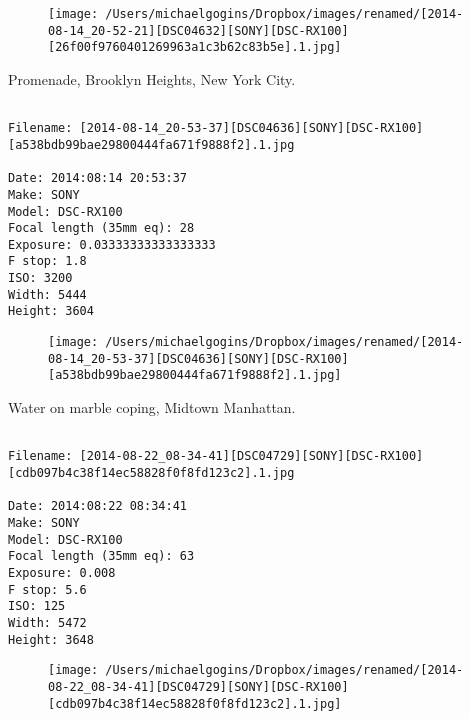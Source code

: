 \begin{figure}
\texttt{[image: /Users/michaelgogins/Dropbox/images/renamed/[2014-08-14\_20-52-21][DSC04632][SONY][DSC-RX100][26f00f9760401269963a1c3b62c83b5e].1.jpg]}
\end{figure}
    
\clearpage
\onecolumn
\noindent Promenade, Brooklyn Heights, New York City.
\noindent
\begin{lstlisting}

Filename: [2014-08-14_20-53-37][DSC04636][SONY][DSC-RX100][a538bdb99bae29800444fa671f9888f2].1.jpg

Date: 2014:08:14 20:53:37
Make: SONY
Model: DSC-RX100
Focal length (35mm eq): 28
Exposure: 0.03333333333333333
F stop: 1.8
ISO: 3200
Width: 5444
Height: 3604
\end{lstlisting}
\clearpage

\begin{figure}
\texttt{[image: /Users/michaelgogins/Dropbox/images/renamed/[2014-08-14\_20-53-37][DSC04636][SONY][DSC-RX100][a538bdb99bae29800444fa671f9888f2].1.jpg]}
\end{figure}
    
\clearpage
\onecolumn
\noindent Water on marble coping, Midtown Manhattan.
\noindent
\begin{lstlisting}

Filename: [2014-08-22_08-34-41][DSC04729][SONY][DSC-RX100][cdb097b4c38f14ec58828f0f8fd123c2].1.jpg

Date: 2014:08:22 08:34:41
Make: SONY
Model: DSC-RX100
Focal length (35mm eq): 63
Exposure: 0.008
F stop: 5.6
ISO: 125
Width: 5472
Height: 3648
\end{lstlisting}
\clearpage

\begin{figure}
\texttt{[image: /Users/michaelgogins/Dropbox/images/renamed/[2014-08-22\_08-34-41][DSC04729][SONY][DSC-RX100][cdb097b4c38f14ec58828f0f8fd123c2].1.jpg]}
\end{figure}
    
